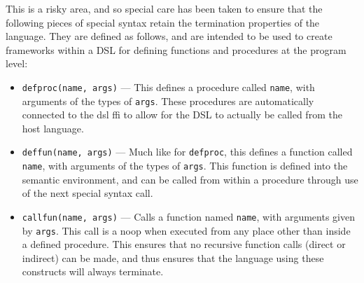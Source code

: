 This is a risky area, and so special care has been taken to ensure that the following pieces of special syntax retain the termination properties of the language. 
They are defined as follows, and are intended to be used to create frameworks within a DSL for defining functions and procedures at the program level:
\begin{itemize}
    \item \texttt{defproc(name, args)} --- This defines a procedure called \texttt{name}, with arguments of the types of \texttt{args}.
    These procedures are automatically connected to the \gls{dsl} \gls{ffi} to allow for the DSL to actually be called from the host language. 
    \item \texttt{deffun(name, args)} --- Much like for \texttt{defproc}, this defines a function called \texttt{name}, with arguments of the types of \texttt{args}. 
    This function is defined into the semantic environment, and can be called from within a procedure through use of the next special syntax call. 
    \item \texttt{callfun(name, args)} --- Calls a function named \texttt{name}, with arguments given by \texttt{args}.
    This call is a \gls{noop} when executed from any place other than inside a defined procedure. 
    This ensures that no recursive function calls (direct or indirect) can be made, and thus ensures that the language using these constructs will always terminate.
\end{itemize}


